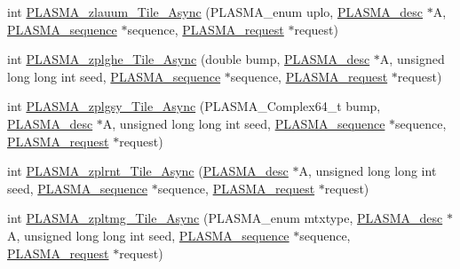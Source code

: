 \begin{DoxyCompactItemize}
\item 
int \hyperlink{group__PLASMA__Complex64__t__Tile__Async_ga425208ce23f59b3120b5bfa7923b50ae_ga425208ce23f59b3120b5bfa7923b50ae}{P\+L\+A\+S\+M\+A\+\_\+zlauum\+\_\+\+Tile\+\_\+\+Async} (P\+L\+A\+S\+M\+A\+\_\+enum uplo, \hyperlink{structplasma__desc__t}{P\+L\+A\+S\+M\+A\+\_\+desc} $\ast$A, \hyperlink{structplasma__sequence__t}{P\+L\+A\+S\+M\+A\+\_\+sequence} $\ast$sequence, \hyperlink{structplasma__request__t}{P\+L\+A\+S\+M\+A\+\_\+request} $\ast$request)
\item 
int \hyperlink{group__PLASMA__Complex64__t__Tile__Async_ga87167295ebd4bad3452479a53981bb9b_ga87167295ebd4bad3452479a53981bb9b}{P\+L\+A\+S\+M\+A\+\_\+zplghe\+\_\+\+Tile\+\_\+\+Async} (double bump, \hyperlink{structplasma__desc__t}{P\+L\+A\+S\+M\+A\+\_\+desc} $\ast$A, unsigned long long int seed, \hyperlink{structplasma__sequence__t}{P\+L\+A\+S\+M\+A\+\_\+sequence} $\ast$sequence, \hyperlink{structplasma__request__t}{P\+L\+A\+S\+M\+A\+\_\+request} $\ast$request)
\item 
int \hyperlink{group__PLASMA__Complex64__t__Tile__Async_gadd20ad669ca318409d2ac938bb13afa2_gadd20ad669ca318409d2ac938bb13afa2}{P\+L\+A\+S\+M\+A\+\_\+zplgsy\+\_\+\+Tile\+\_\+\+Async} (P\+L\+A\+S\+M\+A\+\_\+\+Complex64\+\_\+t bump, \hyperlink{structplasma__desc__t}{P\+L\+A\+S\+M\+A\+\_\+desc} $\ast$A, unsigned long long int seed, \hyperlink{structplasma__sequence__t}{P\+L\+A\+S\+M\+A\+\_\+sequence} $\ast$sequence, \hyperlink{structplasma__request__t}{P\+L\+A\+S\+M\+A\+\_\+request} $\ast$request)
\item 
int \hyperlink{group__PLASMA__Complex64__t__Tile__Async_ga9c7ab272adb91b3c38af66f649223e4e_ga9c7ab272adb91b3c38af66f649223e4e}{P\+L\+A\+S\+M\+A\+\_\+zplrnt\+\_\+\+Tile\+\_\+\+Async} (\hyperlink{structplasma__desc__t}{P\+L\+A\+S\+M\+A\+\_\+desc} $\ast$A, unsigned long long int seed, \hyperlink{structplasma__sequence__t}{P\+L\+A\+S\+M\+A\+\_\+sequence} $\ast$sequence, \hyperlink{structplasma__request__t}{P\+L\+A\+S\+M\+A\+\_\+request} $\ast$request)
\item 
int \hyperlink{group__PLASMA__Complex64__t__Tile__Async_ga7a746cda0e52b435e627522564354c1b_ga7a746cda0e52b435e627522564354c1b}{P\+L\+A\+S\+M\+A\+\_\+zpltmg\+\_\+\+Tile\+\_\+\+Async} (P\+L\+A\+S\+M\+A\+\_\+enum mtxtype, \hyperlink{structplasma__desc__t}{P\+L\+A\+S\+M\+A\+\_\+desc} $\ast$A, unsigned long long int seed, \hyperlink{structplasma__sequence__t}{P\+L\+A\+S\+M\+A\+\_\+sequence} $\ast$sequence, \hyperlink{structplasma__request__t}{P\+L\+A\+S\+M\+A\+\_\+request} $\ast$request)
\item 

\end{DoxyCompactItemize}
